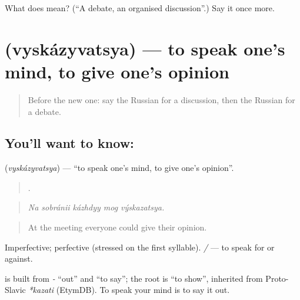 \begin{tcolorbox}[breakable,colback=teal!4,colframe=teal!35!black,title={Before you move on}]
What does  mean? (\textquotedblleft{}A debate, an organised discussion\textquotedblright{}.) Say it once more.
\end{tcolorbox}
\section[\texorpdfstring{\ru{высказываться} (vyskázyvatsya)}{высказываться (vyskázyvatsya)}]{ (vyskázyvatsya) — to speak one’s mind, to give one’s opinion}

\label{lesson:RU-C342-vyskazyvatsya}



\begin{quote}
Before the new one: say the Russian for a discussion, then the Russian for a debate.
\end{quote}

\subsection*{You'll want to know: }
\textbf{} (\emph{vyskázyvatsya}) — \textquotedblleft{}to speak one’s mind, to give one’s opinion\textquotedblright{}.

\begin{quote}
    .
\end{quote}

\begin{quote}
\emph{Na sobránii kázhdyy mog výskazatsya.}
\end{quote}

\begin{quote}
At the meeting everyone could give their opinion.
\end{quote}

Imperfective; perfective \emph{} (stressed on the first syllable). \emph{  / } — to speak for or against.

\begin{cousinweb}
\textbf{} is built from \emph{-} \textquotedblleft{}out\textquotedblright{} and \emph{} \textquotedblleft{}to say\textquotedblright{}; the root is \emph{} \textquotedblleft{}to show\textquotedblright{}, inherited from Proto-Slavic \emph{*kazati} (EtymDB). To speak your mind is to say it out.
\end{cousinweb}

